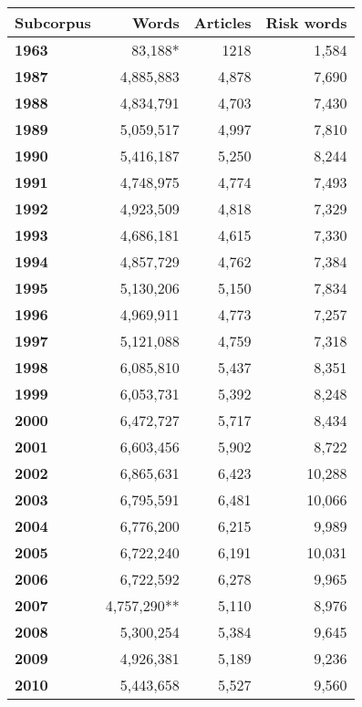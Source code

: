     \begin{table}
        \centering
        \footnotesize
    \begin{tabular}{p{1.5cm}rrr}

\toprule
\textbf{Subcorpus} & \textbf{Words} & \textbf{Articles} & \textbf{Risk words}  \\ \midrule
\textbf{1963} & 83,188* & 1218 &  1,584  \\ 
\textbf{1987} & 4,885,883 & 4,878 &  7,690  \\ 
\textbf{1988} & 4,834,791 & 4,703 &  7,430  \\ 
\textbf{1989} & 5,059,517 & 4,997 &  7,810  \\ 
\textbf{1990} & 5,416,187 & 5,250 &  8,244  \\ 
\textbf{1991} & 4,748,975 & 4,774 &  7,493  \\ 
\textbf{1992} & 4,923,509 & 4,818 &  7,329  \\ 
\textbf{1993} & 4,686,181 & 4,615 &  7,330  \\ 
\textbf{1994} & 4,857,729 & 4,762 &  7,384  \\ 
\textbf{1995} & 5,130,206 & 5,150 &  7,834  \\ 
\textbf{1996} & 4,969,911 & 4,773 &  7,257  \\ 
\textbf{1997} & 5,121,088 & 4,759 &  7,318  \\ 
\textbf{1998} & 6,085,810 & 5,437 &  8,351  \\ 
\textbf{1999} & 6,053,731 & 5,392 &  8,248  \\ 
\textbf{2000} & 6,472,727 & 5,717 &  8,434  \\ 
\textbf{2001} & 6,603,456 & 5,902 &  8,722  \\ 
\textbf{2002} & 6,865,631 & 6,423 & 10,288  \\ 
\textbf{2003} & 6,795,591 & 6,481 & 10,066  \\ 
\textbf{2004} & 6,776,200 & 6,215 &  9,989  \\ 
\textbf{2005} & 6,722,240 & 6,191 & 10,031  \\ 
\textbf{2006} & 6,722,592 & 6,278 &  9,965  \\ 
\textbf{2007} & 4,757,290** & 5,110 &  8,976  \\ 
\textbf{2008} & 5,300,254 & 5,384 &  9,645  \\ 
\textbf{2009} & 4,926,381 & 5,189 &  9,236  \\ 
\textbf{2010} & 5,443,658 & 5,527 &  9,560  \\ 

\end{tabular}
\end{table}
